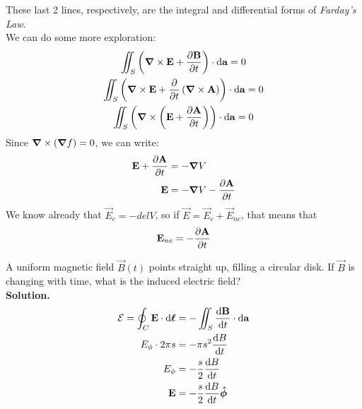 \documentclass[a4paper]{article}
\begin{document}
These last 2 lines, respectively, are the integral and differential forms
of \emph{Farday's Law}.\\
We can do some more exploration:
\begin{gather*}
	\iint_S \left(\del\times\vec{E} +
		\pder{\vec{B}}{t}\right)
		\cdot \d\vec{a} = 0\\
	\iint_S \left(\del\times\vec{E} +
		\pd{t}\left(\del\times\vec{A}\right)\right)
		\cdot \d\vec{a} = 0\\
	\iint_S \left(\del\times\left(\vec{E}+\pder{\vec{A}}{t}\right)\right)
		\cdot \d\vec{a} = 0
\end{gather*}
Since $\boldsymbol{\mathbf{\nabla}}\times(\boldsymbol{\mathbf{\nabla}} f) = 0$, we can write:
\begin{align*}
	\boldsymbol{\mathbf{E}} + \frac{\partial \boldsymbol{\mathbf{A}}}{\partial t} &= -\boldsymbol{\mathbf{\nabla}} V\\
	\boldsymbol{\mathbf{E}} &= -\boldsymbol{\mathbf{\nabla}} V - \frac{\partial \boldsymbol{\mathbf{A}}}{\partial t}
\end{align*}
We know already that $\vec{E}_c = -del V$, so if
$\vec{E} = \vec{E}_c + \vec{E}_{nc}$, that means that
\[ \boldsymbol{\mathbf{E}}_{nc} = -\frac{\partial \boldsymbol{\mathbf{A}}}{\partial t} \]

\begin{eg}
	A uniform magnetic field $\vec{B}(t)$ points straight up, filling a
	circular disk. If $\vec{B}$ is changing with time, what is the induced
	electric field?\\
	\textbf{Solution.}
	\begin{align*}
		\mathcal{E} = \oint_C \boldsymbol{\mathbf{E}} \cdot \mathrm{d}\boldsymbol{\mathbf{\ell}} &=
			-\iint_S \frac{\mathrm{d} \boldsymbol{\mathbf{B}}}{\mathrm{d} t} \cdot \mathrm{d}\boldsymbol{\mathbf{a}}\\
		E_\phi\cdot2\pi s &= -\pi s^2 \frac{\mathrm{d} B}{\mathrm{d} t}\\
		E_\phi &= -\frac{s}{2}\frac{\mathrm{d} B}{\mathrm{d} t}\\
		\boldsymbol{\mathbf{E}} &= -\frac{s}{2}\frac{\mathrm{d} B}{\mathrm{d} t}\boldsymbol{\mathbf{\hat{\phi}}}
	\end{align*}
\end{eg}
\end{document}
